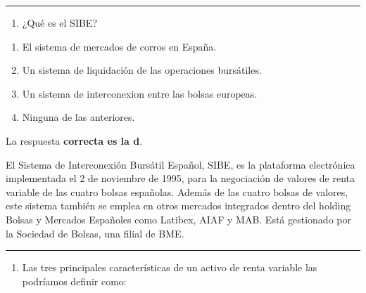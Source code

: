 \documentclass[
  letterpaper,
  DIV=11,
  numbers=noendperiod]{scrreprt}
\providecommand{\tightlist}{%
  \setlength{\itemsep}{0pt}\setlength{\parskip}{0pt}}\usepackage{longtable,booktabs,array}
\begin{document}
\begin{center}\rule{0.5\linewidth}{0.5pt}\end{center}

\begin{enumerate}
\def\labelenumi{\arabic{enumi}.}
\setcounter{enumi}{34}
\tightlist
\item
  ¿Qué es el SIBE?
\end{enumerate}

\begin{enumerate}
\def\labelenumi{\alph{enumi})}
\item
  El sistema de mercados de corros en España.
\item
  Un sistema de liquidación de las operaciones bursátiles.
\item
  Un sistema de interconexion entre las bolsas europeas.
\item
  Ninguna de las anteriores.
\end{enumerate}

\begin{tcolorbox}[enhanced jigsaw, left=2mm, opacityback=0, colback=white, breakable, arc=.35mm, bottomrule=.15mm, rightrule=.15mm, toprule=.15mm, leftrule=.75mm, colframe=quarto-callout-tip-color-frame]
\begin{minipage}[t]{5.5mm}
\textcolor{quarto-callout-tip-color}{\faLightbulb}
\end{minipage}%
\begin{minipage}[t]{\textwidth - 5.5mm}

La respuesta \textbf{correcta es la d}.

El Sistema de Interconexión Bursátil Español, SIBE, es la plataforma
electrónica implementada el 2 de noviembre de 1995, para la negociación
de valores de renta variable de las cuatro bolsas españolas. Además de
las cuatro bolsas de valores, este sistema también se emplea en otros
mercados integrados dentro del holding Bolsas y Mercados Españoles como
Latibex, AIAF y MAB. Está gestionado por la Sociedad de Bolsas, una
filial de BME.

\end{minipage}%
\end{tcolorbox}

\begin{center}\rule{0.5\linewidth}{0.5pt}\end{center}

\begin{enumerate}
\def\labelenumi{\arabic{enumi}.}
\setcounter{enumi}{35}
\tightlist
\item
  Las tres principales características de un activo de renta variable
  las podríamos definir como:
\end{enumerate}
\end{document}

